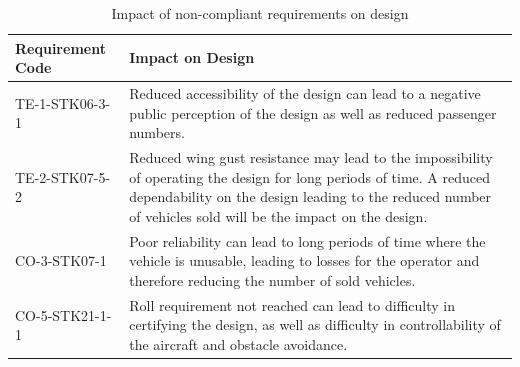 \begin{table}[h]
\caption{Impact of non-compliant requirements on design}
\label{tab:non-comp}
\centering
\begin{tabular}{l|p{12cm}}
\toprule
\textbf{Requirement Code}   & \textbf{Impact on Design}  \\ \midrule
TE-1-STK06-3-1 & Reduced accessibility of the design can lead to a negative public perception of the design as well as reduced passenger numbers. \\ \midrule
TE-2-STK07-5-2 & Reduced wing gust resistance may lead to the impossibility of operating the design for long periods of time. A reduced dependability on the design leading to the reduced number of vehicles sold will be the impact on the design. \\ \midrule
CO-3-STK07-1   & Poor reliability can lead to long periods of time where the vehicle is unusable, leading to losses for the operator and therefore reducing the number of sold vehicles.  \\ \midrule
CO-5-STK21-1-1 & Roll requirement not reached can lead to difficulty in certifying the design, as well as difficulty in controllability of the aircraft and obstacle avoidance.  \\ \bottomrule
\end{tabular}
\end{table}